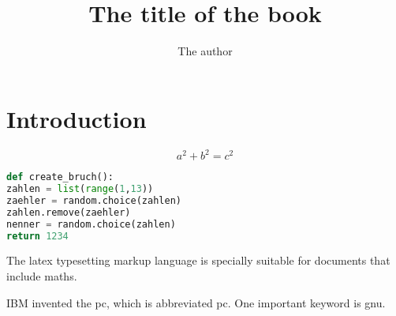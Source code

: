 \documentclass[11pt,english,a5paper]{scrbook}
\title{The title of the book}
\author{The author}
\begin{document}
\maketitle

\frontmatter

\tableofcontents

\listoffigures

\listoftables

\mainmatter

\chapter{Introduction}

\blindtext

\[
a^2+b^2=c^2
\]


\begin{lstlisting}[language={Python}, label={lis:py1}, caption={Some Python Code}]
def create_bruch():
zahlen = list(range(1,13))
zaehler = random.choice(zahlen)
zahlen.remove(zaehler)
nenner = random.choice(zahlen)
return 1234
\end{lstlisting}


\blindtext

\blindtext

\blindtext

\blindtext

\backmatter

The \Gls{latex} typesetting markup language is specially suitable 
for documents that include \gls{maths}. 

IBM invented the \acrlong{pc}, which is abbreviated \acrshort{pc}. One important keyword is \acrfull{gnu}.


\printglossary[type=\acronymtype]

\printglossaries
\end{document}
